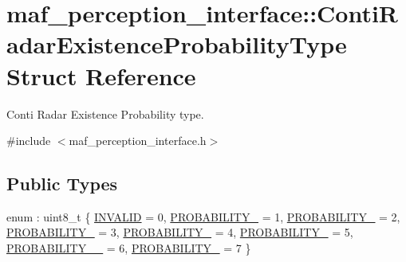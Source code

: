 \hypertarget{structmaf__perception__interface_1_1ContiRadarExistenceProbabilityType}{}\section{maf\+\_\+perception\+\_\+interface\+:\+:Conti\+Radar\+Existence\+Probability\+Type Struct Reference}
\label{structmaf__perception__interface_1_1ContiRadarExistenceProbabilityType}


Conti Radar Existence Probability type.  




{\ttfamily \#include $<$maf\+\_\+perception\+\_\+interface.\+h$>$}

\subsection*{Public Types}
\begin{DoxyCompactItemize}
\item 
enum \+: uint8\+\_\+t \{ \newline
\hyperlink{structmaf__perception__interface_1_1ContiRadarExistenceProbabilityType_a1227569ccde0b17a13b23408e72a52a8ae119b8533e86ea31f28b08960e3d3ffe}{I\+N\+V\+A\+L\+ID} = 0, 
\hyperlink{structmaf__perception__interface_1_1ContiRadarExistenceProbabilityType_a1227569ccde0b17a13b23408e72a52a8a303d77267d7d799abf141e011047620c}{P\+R\+O\+B\+A\+B\+I\+L\+I\+T\+Y\+\_} = 1, 
\hyperlink{structmaf__perception__interface_1_1ContiRadarExistenceProbabilityType_a1227569ccde0b17a13b23408e72a52a8ac3a3e788eee3798cb6f79ef1a6648cc6}{P\+R\+O\+B\+A\+B\+I\+L\+I\+T\+Y\+\_} = 2, 
\hyperlink{structmaf__perception__interface_1_1ContiRadarExistenceProbabilityType_a1227569ccde0b17a13b23408e72a52a8a5e7a7de8146ded66b4008e495f954834}{P\+R\+O\+B\+A\+B\+I\+L\+I\+T\+Y\+\_} = 3, 
\newline
\hyperlink{structmaf__perception__interface_1_1ContiRadarExistenceProbabilityType_a1227569ccde0b17a13b23408e72a52a8ab9d38fad4719418d9f94b44c0dcf52ce}{P\+R\+O\+B\+A\+B\+I\+L\+I\+T\+Y\+\_} = 4, 
\hyperlink{structmaf__perception__interface_1_1ContiRadarExistenceProbabilityType_a1227569ccde0b17a13b23408e72a52a8a87345ae087c5c17d1e9da214d74de0cf}{P\+R\+O\+B\+A\+B\+I\+L\+I\+T\+Y\+\_} = 5, 
\hyperlink{structmaf__perception__interface_1_1ContiRadarExistenceProbabilityType_a1227569ccde0b17a13b23408e72a52a8ada7c6f87881b931a0154e95d67229cc3}{P\+R\+O\+B\+A\+B\+I\+L\+I\+T\+Y\+\_\+\_} = 6, 
\hyperlink{structmaf__perception__interface_1_1ContiRadarExistenceProbabilityType_a1227569ccde0b17a13b23408e72a52a8af1c77fe69e5dd5c856c7a2f72ef1fbe5}{P\+R\+O\+B\+A\+B\+I\+L\+I\+T\+Y\+\_} = 7
 \}
\end{DoxyCompactItemize}
